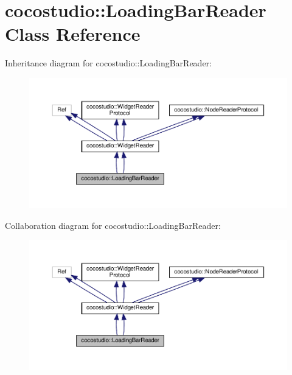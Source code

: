 \hypertarget{classcocostudio_1_1LoadingBarReader}{}\section{cocostudio\+:\+:Loading\+Bar\+Reader Class Reference}
\label{classcocostudio_1_1LoadingBarReader}


Inheritance diagram for cocostudio\+:\+:Loading\+Bar\+Reader\+:
\nopagebreak
\begin{figure}[H]
\begin{center}
\leavevmode
\includegraphics[width=350pt]{classcocostudio_1_1LoadingBarReader__inherit__graph}
\end{center}
\end{figure}


Collaboration diagram for cocostudio\+:\+:Loading\+Bar\+Reader\+:
\nopagebreak
\begin{figure}[H]
\begin{center}
\leavevmode
\includegraphics[width=350pt]{classcocostudio_1_1LoadingBarReader__coll__graph}
\end{center}
\end{figure}
